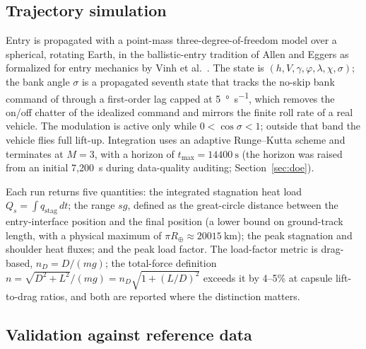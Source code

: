 \subsection{Trajectory simulation}
\label{sec:traj}

Entry is propagated with a point-mass three-degree-of-freedom model over a
spherical, rotating Earth, in the ballistic-entry tradition of Allen and
Eggers \cite{allen1958} as formalized for entry mechanics by Vinh et al.\
\cite{vinh1980}. The state is
$(h,V,\gamma,\varphi,\lambda,\chi,\sigma)$; the bank angle $\sigma$ is a
propagated seventh state that tracks the no-skip bank command of
\cite{dirkx2017entry} through a first-order lag capped at
\SI{5}{\degree\per\s}, which removes the on/off chatter of the idealized
command and mirrors the finite roll rate of a real vehicle. The modulation
is active only while $0<\cos\sigma<1$; outside that band the vehicle flies
full lift-up. Integration uses an adaptive Runge--Kutta scheme and
terminates at $M=3$, with a horizon of $t_{\max}=\SI{14400}{\s}$ (the
horizon was raised from an initial 7{,}200~s during data-quality auditing;
Section~\ref{sec:doe}).

Each run returns five quantities: the integrated stagnation heat load
$Q_s=\int q_{\mathrm{stag}}\,dt$; the range $sg$, defined as the
great-circle distance between the entry-interface position and the final
position (a lower bound on ground-track length, with a physical maximum of
$\pi R_{\oplus}\approx\SI{20015}{\kilo\metre}$); the peak stagnation and
shoulder heat fluxes; and the peak load factor. The load-factor metric is
drag-based, $n_D=D/(mg)$; the total-force definition
$n=\sqrt{D^2+L^2}/(mg)=n_D\sqrt{1+(L/D)^2}$ exceeds it by 4--5\% at capsule
lift-to-drag ratios, and both are reported where the distinction matters.

\subsection{Validation against reference data}
\label{sec:validation}

